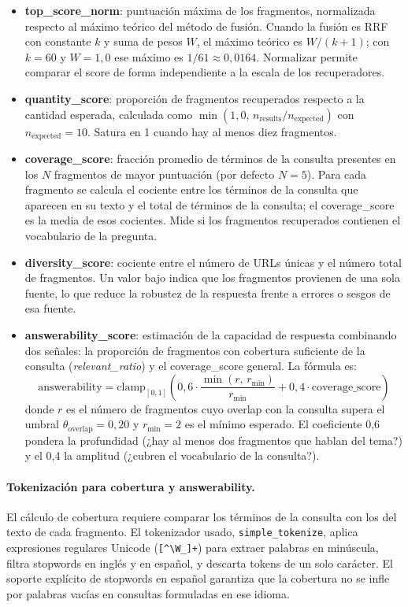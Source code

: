 \documentclass[11pt]{article}
\begin{document}
\begin{itemize}
\item \textbf{top\_score\_norm}: puntuación máxima de los fragmentos, normalizada respecto al
máximo teórico del método de fusión. Cuando la fusión es RRF con constante $k$ y suma de pesos
$W$, el máximo teórico es $W/(k+1)$; con $k=60$ y $W=1{,}0$ ese máximo es
$1/61 \approx 0{,}0164$. Normalizar permite comparar el score de forma independiente a la
escala de los recuperadores.

\item \textbf{quantity\_score}: proporción de fragmentos recuperados respecto a la cantidad
esperada, calculada como $\min(1{,}0,\, n_{\text{results}} / n_{\text{expected}})$ con
$n_{\text{expected}}=10$. Satura en 1 cuando hay al menos diez fragmentos.

\item \textbf{coverage\_score}: fracción promedio de términos de la consulta presentes en los
$N$ fragmentos de mayor puntuación (por defecto $N=5$). Para cada fragmento se calcula el
cociente entre los términos de la consulta que aparecen en su texto y el total de términos de
la consulta; el coverage\_score es la media de esos cocientes. Mide si los fragmentos
recuperados contienen el vocabulario de la pregunta.

\item \textbf{diversity\_score}: cociente entre el número de URLs únicas y el número total
de fragmentos. Un valor bajo indica que los fragmentos provienen de una sola fuente, lo que
reduce la robustez de la respuesta frente a errores o sesgos de esa fuente.

\item \textbf{answerability\_score}: estimación de la capacidad de respuesta combinando dos
señales: la proporción de fragmentos con cobertura suficiente de la consulta
(\emph{relevant\_ratio}) y el coverage\_score general. La fórmula es:
\[
\text{answerability} = \mathrm{clamp}_{[0,1]}\!\left(0{,}6 \cdot
\frac{\min(r,\, r_{\min})}{r_{\min}} + 0{,}4 \cdot \text{coverage\_score}\right)
\]
donde $r$ es el número de fragmentos cuyo overlap con la consulta supera el umbral
$\theta_{\text{overlap}}=0{,}20$ y $r_{\min}=2$ es el mínimo esperado. El coeficiente 0,6
pondera la profundidad (¿hay al menos dos fragmentos que hablan del tema?) y el 0,4 la amplitud
(¿cubren el vocabulario de la consulta?).
\end{itemize}

\paragraph{Tokenización para cobertura y answerability.}
El cálculo de cobertura requiere comparar los términos de la consulta con los del texto de cada
fragmento. El tokenizador usado, \texttt{simple\_tokenize}, aplica expresiones regulares
Unicode (\texttt{[\textasciicircum\textbackslash W\_]+}) para extraer palabras en minúscula,
filtra stopwords en inglés y en español, y descarta tokens de un solo carácter. El soporte
explícito de stopwords en español garantiza que la cobertura no se infle por palabras vacías en
consultas formuladas en ese idioma.
\end{document}
